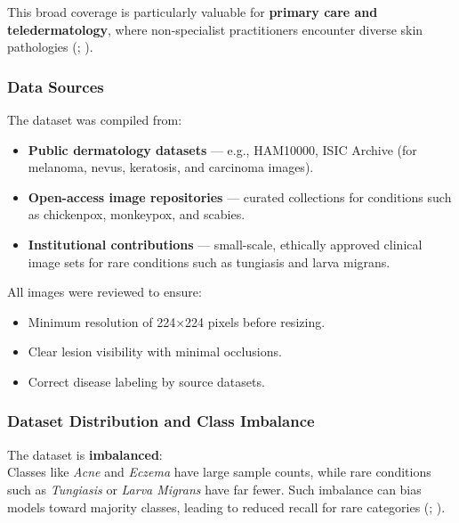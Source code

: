 \documentclass[
  12pt,
  oneside]{article}
\providecommand{\tightlist}{%
  \setlength{\itemsep}{0pt}\setlength{\parskip}{0pt}}
\begin{document}
This broad coverage is particularly valuable for \textbf{primary care
and teledermatology}, where non-specialist practitioners encounter
diverse skin pathologies (; ).

\subsubsection{Data Sources}\label{data-sources}

The dataset was compiled from:

\begin{itemize}
\tightlist
\item
  \textbf{Public dermatology datasets} --- e.g., HAM10000, ISIC Archive
  (for melanoma, nevus, keratosis, and carcinoma images).
\item
  \textbf{Open-access image repositories} --- curated collections for
  conditions such as chickenpox, monkeypox, and scabies.
\item
  \textbf{Institutional contributions} --- small-scale, ethically
  approved clinical image sets for rare conditions such as tungiasis and
  larva migrans.
\end{itemize}

All images were reviewed to ensure:

\begin{itemize}
\tightlist
\item
  Minimum resolution of 224×224 pixels before resizing.
\item
  Clear lesion visibility with minimal occlusions.
\item
  Correct disease labeling by source datasets.
\end{itemize}

\subsubsection{Dataset Distribution and Class
Imbalance}\label{dataset-distribution-and-class-imbalance}

The dataset is \textbf{imbalanced}:\\
Classes like \emph{Acne} and \emph{Eczema} have large sample counts,
while rare conditions such as \emph{Tungiasis} or \emph{Larva Migrans}
have far fewer. Such imbalance can bias models toward majority classes,
leading to reduced recall for rare categories
(;
).
\end{document}
